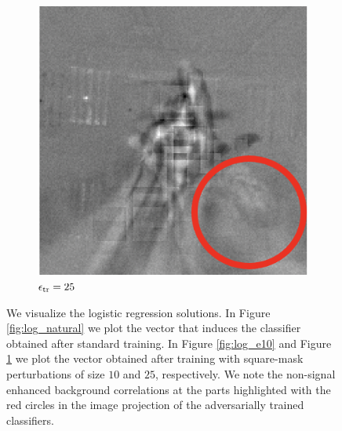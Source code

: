 \begin{figure}[!ht]
\begin{subfigure}{0.31\textwidth}
    \centering
    \includegraphics[width=.80\linewidth]{plotsAistats/perTrain25logisticReg.png}
    \caption{$\epsilon_{\text{tr}} = 25$}
    \label{fig:log_e25}
\end{subfigure}
    \caption{We visualize the logistic regression solutions. In Figure \ref{fig:log_natural} we plot the vector that induces the classifier obtained after standard training. In Figure \ref{fig:log_e10} and Figure \ref{fig:log_e25} we plot the vector obtained after training with square-mask perturbations of size $10$ and $25$, respectively. We note the non-signal enhanced background correlations at the parts highlighted with the red circles in the image projection of the adversarially trained classifiers. }
    \label{fig:visulation_log}
\end{figure}
